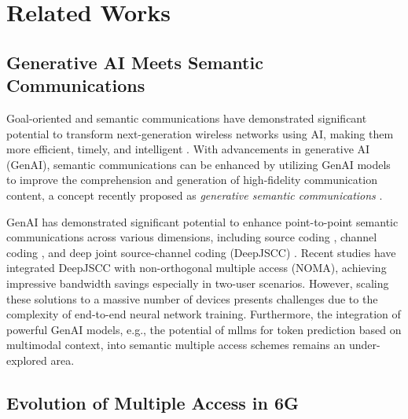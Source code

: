 \section{Related Works}
\subsection{Generative AI Meets Semantic Communications}
Goal-oriented and semantic communications have demonstrated significant potential to transform next-generation wireless networks using AI, making them more efficient, timely, and intelligent \cite{strinati2024goal, beyondBits}. 
With advancements in generative AI (GenAI), semantic communications can be enhanced by utilizing GenAI models to improve the comprehension and generation of high-fidelity communication content, a concept recently proposed as {\it generative semantic communications} \cite{Liang2024generative,DaiMagzine}.

GenAI has demonstrated significant potential to enhance point-to-point semantic communications across various dimensions, including source coding \cite{deletang2023language, qiao2024latency, cicchetti2024language, ren2024generative,Extreme}, channel coding \cite{choukroun2022error,nam2024language}, and deep joint source-channel coding (DeepJSCC) \cite{yilmaz2024high, erdemir2023generative,devoto2024adaptive,zhang2025semantics}. Recent studies \cite{yilmaz2023distributed, liang2024orthogonal, zhang2023deepma, mu2023exploiting} have integrated DeepJSCC with non-orthogonal multiple access (NOMA), achieving impressive bandwidth savings especially in two-user scenarios. However, scaling these solutions to a massive number of devices presents challenges due to the complexity of end-to-end neural network training. Furthermore, the integration of powerful GenAI models, e.g., the potential of \gls*{mllm}s for token prediction based on multimodal context, into semantic multiple access schemes remains an under-explored area.

\subsection{Evolution of Multiple Access in 6G}

